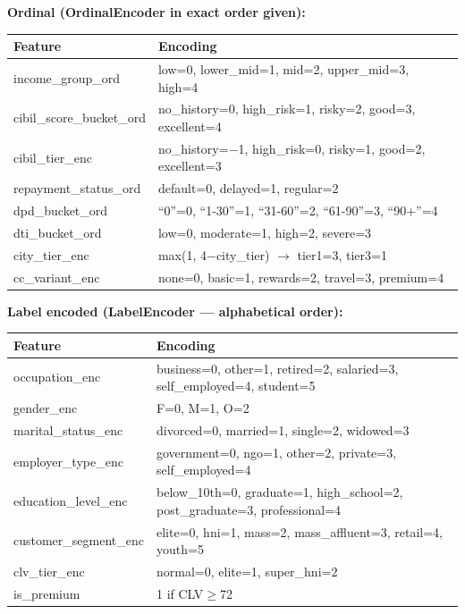 \documentclass[12pt,a4paper]{article}
\begin{document}
\textbf{Ordinal (OrdinalEncoder in exact order given):}

\begin{tabular}{ll}
\toprule
\textbf{Feature} & \textbf{Encoding} \\
\midrule
income\_group\_ord        & low=0, lower\_mid=1, mid=2, upper\_mid=3, high=4 \\
cibil\_score\_bucket\_ord & no\_history=0, high\_risk=1, risky=2, good=3, excellent=4 \\
cibil\_tier\_enc          & no\_history=$-$1, high\_risk=0, risky=1, good=2, excellent=3 \\
repayment\_status\_ord    & default=0, delayed=1, regular=2 \\
dpd\_bucket\_ord          & ``0''=0, ``1-30''=1, ``31-60''=2, ``61-90''=3, ``90+''=4 \\
dti\_bucket\_ord          & low=0, moderate=1, high=2, severe=3 \\
city\_tier\_enc           & max(1, 4$-$city\_tier) $\rightarrow$ tier1=3, tier3=1 \\
cc\_variant\_enc          & none=0, basic=1, rewards=2, travel=3, premium=4 \\
\bottomrule
\end{tabular}

\textbf{Label encoded (LabelEncoder — alphabetical order):}

\begin{tabular}{ll}
\toprule
\textbf{Feature} & \textbf{Encoding} \\
\midrule
occupation\_enc        & business=0, other=1, retired=2, salaried=3, self\_employed=4, student=5 \\
gender\_enc            & F=0, M=1, O=2 \\
marital\_status\_enc   & divorced=0, married=1, single=2, widowed=3 \\
employer\_type\_enc    & government=0, ngo=1, other=2, private=3, self\_employed=4 \\
education\_level\_enc  & below\_10th=0, graduate=1, high\_school=2, post\_graduate=3, professional=4 \\
customer\_segment\_enc & elite=0, hni=1, mass=2, mass\_affluent=3, retail=4, youth=5 \\
clv\_tier\_enc         & normal=0, elite=1, super\_hni=2 \\
is\_premium            & 1 if CLV$\geq$72 \\
\bottomrule
\end{tabular}
\end{document}

